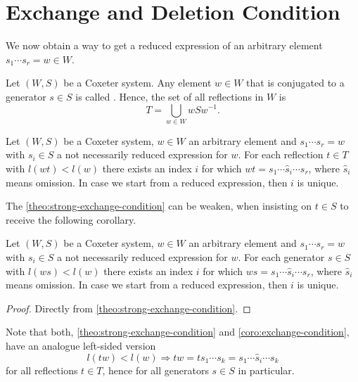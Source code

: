 \section{Exchange and Deletion Condition}
\label{sec:coxeter-groups-exchange-deletion-condition}

We now obtain a way to get a reduced expression of an arbitrary element $s_1 \cdots s_r = w \in W$.

\begin{defi}
	Let $(W,S)$ be a Coxeter system. Any element $w \in W$ that is conjugated to a generator $s \in S$ is called . Hence, the set of all reflections in $W$ is
	$$ T = \bigcup_{w \in W} wSw^{-1}. $$
\end{defi}

\begin{theo}
	Let $(W,S)$ be a Coxeter system, $w \in W$ an arbitrary element and ${s_1 \cdots s_r = w}$ with $s_i \in S$ a not necessarily reduced expression for $w$. For each reflection $t \in T$ with $l(wt) < l(w)$ there exists an index $i$ for which $wt = s_1 \cdots \hat s_i \cdots s_r$, where $\hat s_i$ means omission. In case we start from a reduced expression, then $i$ is unique.
\end{theo}

The \ref{theo:strong-exchange-condition} can be weaken, when insisting on $t \in S$ to receive the following corollary.

\begin{coro}
	Let $(W,S)$ be a Coxeter system, $w \in W$ an arbitrary element and ${s_1 \cdots s_r = w}$ with $s_i \in S$ a not necessarily reduced expression for $w$. For each generator $s \in S$ with $l(ws) < l(w)$ there exists an index $i$ for which $ws = s_1 \cdots \hat s_i \cdots s_r$, where $\hat s_i$ means omission. In case we start from a reduced expression, then $i$ is unique.

	\begin{proof}
		Directly from \ref{theo:strong-exchange-condition}.
	\end{proof}
\end{coro}

\begin{rema}
	Note that both, \ref{theo:strong-exchange-condition} and \ref{coro:exchange-condition}, have an analogue left-sided version
	$$ l(tw) < l(w) \Rightarrow tw = t s_1 \cdots s_k = s_1 \cdots \hat s_i \cdots s_k $$
	for all reflections $t \in T$, hence for all generators $s \in S$ in particular.
\end{rema}

